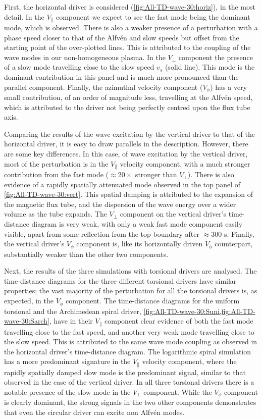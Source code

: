 First, the horizontal driver is considered (\cref{fig:All-TD-wave-30:horiz}), in the most detail.
In the $V_\parallel$ component we expect to see the fast mode being the dominant mode, which is observed.
There is also a weaker presence of a perturbation with a phase speed closer to that of the Alfv\'en and slow speeds but offset from the starting point of the over-plotted lines.
This is attributed to the coupling of the wave modes in our non-homogeneous plasma.
In the $V_\perp$ component the presence of a slow mode travelling close to the slow speed $v_s$ (solid line).
This mode is the dominant contribution in this panel and is much more pronounced than the parallel component.
Finally, the azimuthal velocity component ($V_\phi$) has a very small contribution, of an order of magnitude less, travelling at the Alfv\'en speed, which is attributed to the driver not being perfectly centred upon the flux tube axis.

Comparing the results of the wave excitation by the vertical driver to that of the horizontal driver, it is easy to draw parallels in the description.
However, there are some key differences.
In this case, of wave excitation by the vertical driver, most of the perturbation is in the $V_\parallel$ velocity component, with a much stronger contribution from the fast mode ($\approx 20 \times$ stronger than $V_\perp$).
There is also evidence of a rapidly spatially attenuated mode observed in the top panel of \cref{fig:All-TD-wave-30:vert}.
This spatial damping is attributed to the expansion of the magnetic flux tube, and the dispersion of the wave energy over a wider volume as the tube expands.
The $V_\perp$ component on the vertical driver's time-distance diagram is very weak, with only a weak fast mode component easily visible, apart from some reflection from the top boundary after $\approx300$ s.
Finally, the vertical driver's $V_\phi$ component is, like its horizontally driven $V_\phi$ counterpart, substantially weaker than the other two components.

Next, the results of the three simulations with torsional drivers are analysed.
The time-distance diagrams for the three different torsional drivers have similar properties; the vast majority of the perturbation for all the torsional drivers is, as expected, in the $V_\phi$ component.
The time-distance diagrams for the uniform torsional and the Archimedean spiral driver, \cref{fig:All-TD-wave-30:Suni,fig:All-TD-wave-30:Sarch}, have in their $V_\parallel$ component clear evidence of both the fast mode travelling close to the fast speed, and another very weak mode travelling close to the slow speed.
This is attributed to the same wave mode coupling as observed in the horizontal driver's time-distance diagram.
The logarithmic spiral simulation has a more predominant signature in the $V_\parallel$ velocity component, where the rapidly spatially damped slow mode is the predominant signal, similar to that observed in the case of the vertical driver.
In all three torsional drivers there is a notable presence of the slow mode in the $V_\perp$ component.
While the $V_\phi$ component is clearly dominant, the strong signals in the two other components demonstrates that even the circular driver can excite non Alfv\'en modes.

